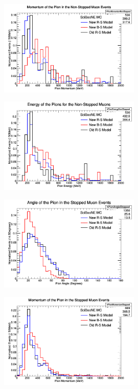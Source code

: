 \documentclass[11pt]{article}
\begin{document}
\begin{figure}[H]
\centering
\includegraphics[width=0.6\textwidth]{NMPionPlottingImages/2-NMPionPlotting.png}
\caption{}
\end{figure}

\begin{figure}[H]
\centering
\includegraphics[width=0.6\textwidth]{NMPionPlottingImages/3-NMPionPlotting.png}
\caption{}
\end{figure}

\begin{figure}[H]
\centering
\includegraphics[width=0.6\textwidth]{NMPionPlottingImages/4-NMPionPlotting.png}
\caption{}
\end{figure}

\begin{figure}[H]
\centering
\includegraphics[width=0.6\textwidth]{NMPionPlottingImages/5-NMPionPlotting.png}
\caption{}
\end{figure}
\end{document}
